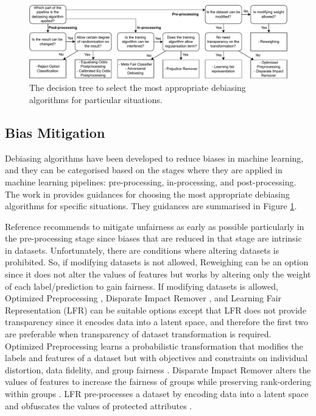 \documentclass[sigconf,review]{acmart}
\begin{document}
	\begin{figure}
		\includegraphics[width=\linewidth]{figures/wizard-debiasing}
		\caption{The decision tree to select the most appropriate debiasing algorithms for particular situations.}
		\label{fig:wizard-debiasing}
	\end{figure}
	
	\subsection{Bias Mitigation}
	\label{sec:bias_mitigation}
	
	Debiasing algorithms have been developed to reduce biases in machine learning, and they can be categorised based on the stages where they are applied in machine learning pipelines: pre-processing, in-processing, and post-processing. The work in  \cite{mahoney2020ai,ibmaif3602022guidance} provides guidances for choosing the most appropriate debiasing algorithms for specific situations. They guidances are summarised in Figure \ref{fig:wizard-debiasing}.
	
	Reference \cite{mahoney2020ai} recommends to mitigate unfairness as early as possible particularly in the pre-processing stage since biases that are reduced in that stage are intrinsic in datasets. Unfortunately, there are conditions where altering datasets is prohibited. So, if modifying datasets is not allowed, Reweighing \cite{kamiran2011reweighing} can be an option since it does not alter the values of features but works by altering only the weight of each label/prediction to gain fairness. If modifying datasets is allowed, Optimized Preprocessing \cite{calmon2017optimized}, Disparate Impact Remover \cite{feldman2015disparate}, and Learning Fair Representation (LFR) \cite{zemel2013lfr} can be suitable options except that LFR does not provide transparency since it encodes data into a latent space, and therefore the first two are preferable when transparency of dataset transformation is required.
	Optimized Preprocessing learns a probabilistic transformation that modifies the labels and features of a dataset but with objectives and constraints on individual distortion, data fidelity, and group fairness \cite{mahoney2020ai,calmon2017optimized}.
	Disparate Impact Remover alters the values of features to increase the fairness of groups while preserving rank-ordering within groups \cite{mahoney2020ai,feldman2015disparate}.
	LFR pre-processes a dataset by encoding data into a latent space and obfuscates the values of protected attributes \cite{mahoney2020ai,zemel2013lfr}.
	
\end{document}
